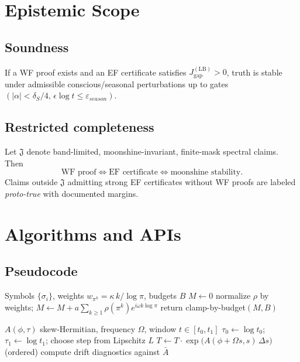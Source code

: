 \documentclass[11pt]{article}
\theoremstyle{plain}
\theoremstyle{definition}
\newcommand{\LB}{\mathrm{LB}}
\newcommand{\Jgap}{J^{(\LB)}_{\text{gap}}}
\begin{document}
\section{Epistemic Scope}\label{sec:epistemics}
\subsection{Soundness}
If a WF proof exists and an EF certificate satisfies \(\Jgap>0\), truth is stable under admissible conscious/seasonal perturbations up to gates \((|\alpha|<\delta_S/4,\, \epsilon\log t\le\varepsilon_{season})\).

\subsection{Restricted completeness}
Let \(\mathfrak{J}\) denote band-limited, moonshine-invariant, finite-mask spectral claims. Then
\begin{equation}
\text{WF proof}\iff\text{EF certificate}\iff\text{moonshine stability}.
\end{equation}
Claims outside \(\mathfrak{J}\) admitting strong EF certificates without WF proofs are labeled \emph{proto-true} with documented margins.

\section{Algorithms and APIs}\label{sec:algos}
\subsection{Pseudocode}
\begin{algorithm}[H]
\caption{CSC $\to$ DRMM Driver}
\begin{algorithmic}[1]
\Require Symbols $\{\sigma_i\}$, weights $w_{\pi^k}=\kappa\,k/\log\pi$, budgets $B$
\State $M\leftarrow 0$
  \State normalize $\rho$ by weights; $M\leftarrow M + a\sum_{k\ge1}\rho(\pi^k)e^{i\omega k\log\pi}$
\EndFor
\State return clamp-by-budget$(M,B)$
\end{algorithmic}
\end{algorithm}

\begin{algorithm}[H]
\caption{Log-Floquet Propagator}
\begin{algorithmic}[1]
\Require $A(\phi,\tau)$ skew-Hermitian, frequency $\Omega$, window $t\in[t_0,t_1]$
\State $\tau_0\leftarrow\log t_0$; $\tau_1\leftarrow\log t_1$; choose step from Lipschitz $L$
  \State $T\leftarrow T\cdot\exp\big(A(\phi+\Omega s, s)\,\Delta s\big)$ (ordered)
\EndFor
\State compute drift diagnostics against $\bar A$
\end{algorithmic}
\end{algorithm}
\end{document}
